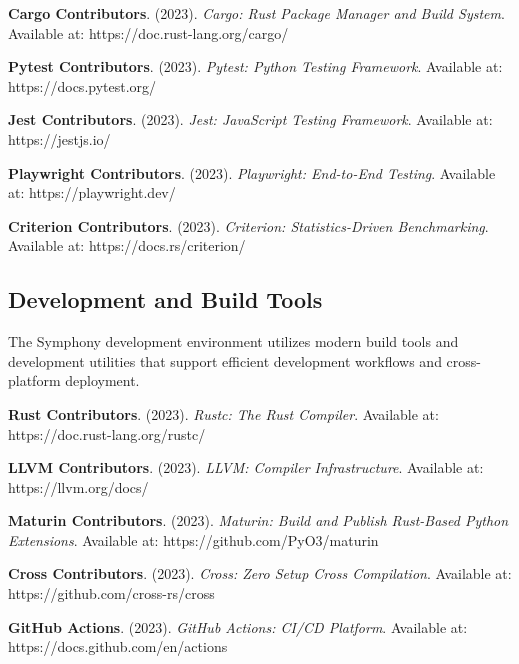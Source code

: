 \begin{compactlist}
    \item \textbf{Cargo Contributors}. (2023). \textit{Cargo: Rust Package Manager and Build System}. Available at: https://doc.rust-lang.org/cargo/
    \item \textbf{Pytest Contributors}. (2023). \textit{Pytest: Python Testing Framework}. Available at: https://docs.pytest.org/
    \item \textbf{Jest Contributors}. (2023). \textit{Jest: JavaScript Testing Framework}. Available at: https://jestjs.io/
    \item \textbf{Playwright Contributors}. (2023). \textit{Playwright: End-to-End Testing}. Available at: https://playwright.dev/
    \item \textbf{Criterion Contributors}. (2023). \textit{Criterion: Statistics-Driven Benchmarking}. Available at: https://docs.rs/criterion/
\end{compactlist}

\subsection*{Development and Build Tools}

The Symphony development environment utilizes modern build tools and development utilities that support efficient development workflows and cross-platform deployment.

\begin{compactlist}
    \item \textbf{Rust Contributors}. (2023). \textit{Rustc: The Rust Compiler}. Available at: https://doc.rust-lang.org/rustc/
    \item \textbf{LLVM Contributors}. (2023). \textit{LLVM: Compiler Infrastructure}. Available at: https://llvm.org/docs/
    \item \textbf{Maturin Contributors}. (2023). \textit{Maturin: Build and Publish Rust-Based Python Extensions}. Available at: https://github.com/PyO3/maturin
    \item \textbf{Cross Contributors}. (2023). \textit{Cross: Zero Setup Cross Compilation}. Available at: https://github.com/cross-rs/cross
    \item \textbf{GitHub Actions}. (2023). \textit{GitHub Actions: CI/CD Platform}. Available at: https://docs.github.com/en/actions
\end{compactlist}
